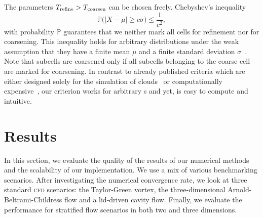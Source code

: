 \documentclass[runningheads]{llncs}
\begin{document}
The parameters $T_\text{refine} > T_\text{coarsen}$ can be chosen freely.
Chebyshev's inequality
\begin{equation}
  \label{eq:chebychev}
  \mathbb{P}\bigl(\vert X - \mu \vert \geq c \sigma \bigr) \leq \frac{1}{c^2},
\end{equation}
with probability $\mathbb{P}$ guarantees that we neither mark all cells for refinement nor for coarsening.
This inequality holds for arbitrary distributions under the weak assumption that they have a finite mean $\mu$ and a finite standard deviation $\sigma$~\cite{wasserman2004all}.
Note that subcells are coarsened only if all subcells belonging to the coarse cell are marked for coarsening.
In contrast to already published criteria which are either designed solely for the simulation of clouds~\cite{muller2010adaptive} or computationally expensive~\cite{fambri2017space}, our criterion works for arbitrary \pde{}s and yet, is easy to compute and intuitive.

\section{Results}\label{sec:results}
In this section, we evaluate the quality of the results of our numerical methods and the scalability of our implementation.
We use a mix of various benchmarking scenarios.
After investigating the numerical convergence rate, we look at three standard \textsc{cfd} scenarios: the Taylor-Green vortex, the three-dimensional Arnold-Beltrami-Childress flow and a lid-driven cavity flow.
Finally, we evaluate the performance for stratified flow scenarios in both two and three dimensions.
\end{document}
